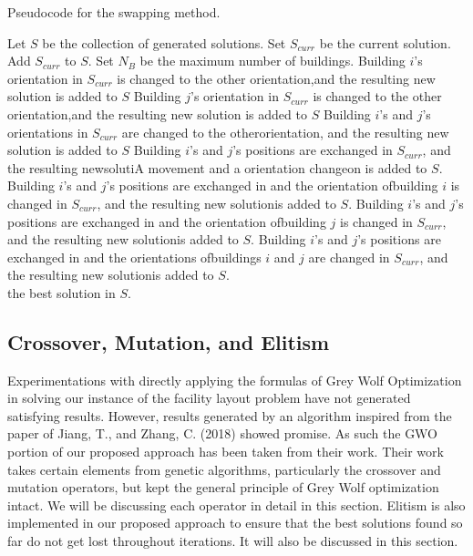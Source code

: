 \begin{algorithm}
\caption{Pseudocode for the swapping method.}
\label{pseudocode-swapping}
\begin{algorithmic}[1]
\State Let $S$ be the collection of generated solutions.
\State Set $S_{curr}$ be the current solution.
\State Add $S_{curr}$ to $S$.
\State Set $N_{B}$ be the maximum number of buildings.
		\State Building $i$'s orientation in $S_{curr}$ is changed to the other orientation,\WRP and the resulting new solution is added to $S$
		\State Building $j$'s orientation in $S_{curr}$ is changed to the other orientation,\WRP and the resulting new solution is added to $S$
		\State Building $i$'s and $j$'s orientations in $S_{curr}$ are changed to the other\WRP orientation, and the resulting new solution is added to $S$
		\State Building $i$'s and $j$'s positions are exchanged in $S_{curr}$, and the resulting new\WRP solutiA movement and a orientation changeon is added to $S$.
		\State Building $i$'s and $j$'s positions are exchanged in and the orientation of\WRP building $i$ is changed in $S_{curr}$, and the resulting new solution\WRP is added to $S$.
		\State Building $i$'s and $j$'s positions are exchanged in and the orientation of\WRP building $j$ is changed in $S_{curr}$, and the resulting new solution\WRP is added to $S$.
		\State Building $i$'s and $j$'s positions are exchanged in and the orientations of\WRP buildings $i$ and $j$ are changed in $S_{curr}$, and the resulting new solution\WRP is added to $S$.
	\EndFor
\EndFor \\
\Return the best solution in $S$.
\end{algorithmic}
\end{algorithm}

\subsection{Crossover, Mutation, and Elitism}
Experimentations with directly applying the formulas of Grey Wolf Optimization in solving our instance of the facility layout problem have not generated satisfying results. However, results generated by an algorithm inspired from the paper of Jiang, T., and Zhang, C. (2018) \cite{Jiang2018} showed promise. As such the GWO portion of our proposed approach has been taken from their work. Their work takes certain elements from genetic algorithms, particularly the crossover and mutation operators, but kept the general principle of Grey Wolf optimization intact. We will be discussing each operator in detail in this section. Elitism is also implemented in our proposed approach to ensure that the best solutions found so far do not get lost throughout iterations. It will also be discussed in this section.

